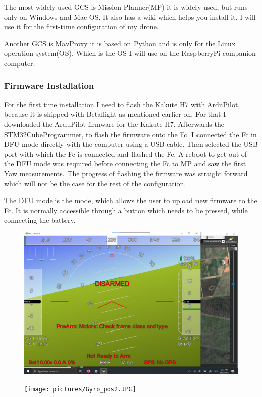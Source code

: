 \documentclass{article}
\begin{document}
	The most widely used GCS is Mission Planner(MP)\cite{MissionPlanner} it is widely used, but runs only on Windows and Mac OS. It also has a wiki which helps you install it. I will use it for the first-time configuration of my drone. 
	
	Another GCS is MavProxy it is based on Python and is only for the Linux operation system(OS). Which is the OS I will use on the RaspberryPi companion computer. 

	\subsubsection{Firmware Installation}
	
	For the first time installation I need to flash the Kakute H7 with ArduPilot, because it is shipped with Betaflight as mentioned earlier on. For that I downloaded the ArduPilot firmware\cite{ArduPilotFirmware} for the Kakute H7. Afterwards the STM32CubeProgrammer\cite{STM32CubeProgrammer}, to flash the firmware onto the Fc. I connected the Fc in \gls{DFU} mode directly with the computer using a USB cable. Then selected the USB port with which the Fc is connected and flashed the Fc. A reboot to get out of the DFU mode was required before connecting the Fc to MP and saw the first Yaw measurements. The progress of flashing the firmware was straight forward which will not be the case for the rest of the configuration. 
	\begin{Explanation}%
		\item The \gls{DFU} mode is the mode, which allows the user to upload new firmware to the \gls{Fc}. It is normally accessible through a button which needs to be pressed, while connecting the battery. 

	\end{Explanation}

\begin{figure}[h]
	\centering
	\includegraphics[width=0.7\linewidth]{pictures/Gyro_pos2_large}
	\caption{}
	\label{fig:gyropos2large}
\end{figure}
\begin{figure}[h]
	\centering
	\texttt{[image: pictures/Gyro\_pos2.JPG]}
	\caption{}
	\label{fig:gyropos2}
\end{figure}
\end{document}

